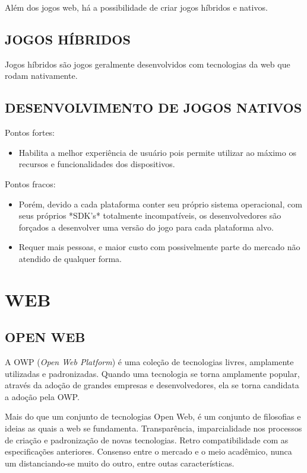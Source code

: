Além dos jogos web, há a possibilidade de criar jogos híbridos e nativos.

\subsection{JOGOS HÍBRIDOS}

Jogos híbridos são jogos geralmente desenvolvidos com tecnologias da
web que rodam nativamente.

\subsection{DESENVOLVIMENTO DE JOGOS NATIVOS}

Pontos fortes:
\begin{itemize}
\item Habilita a melhor experiência de usuário pois permite utilizar ao
máximo os recursos e funcionalidades dos dispositivos.
\end{itemize}

Pontos fracos:
\begin{itemize}
\item Porém, devido a cada plataforma conter seu próprio sistema operacional,
com seus próprios *SDK's* totalmente incompatíveis, os desenvolvedores são
forçados a desenvolver uma versão do jogo para cada plataforma alvo.
\item Requer mais pessoas, e maior custo com possivelmente parte do
mercado não atendido de qualquer forma.
\end{itemize}

\section{WEB}

\subsection{OPEN WEB}
A OWP (\textit{Open Web Platform}) é uma coleção de tecnologias
livres, amplamente utilizadas e padronizadas. Quando uma tecnologia se
torna amplamente popular, através da adoção de grandes empresas e
desenvolvedores, ela se torna candidata a adoção pela OWP.

Mais do que um conjunto de tecnologias Open Web, é um conjunto
de filosofias e ideias as quais a web se fundamenta. Transparência,
imparcialidade nos processos de criação e padronização de novas
tecnologias. Retro compatibilidade com as especificações anteriores.
Consenso entre o mercado e o meio acadêmico, nunca um distanciando-se
muito do outro, entre outas características.

